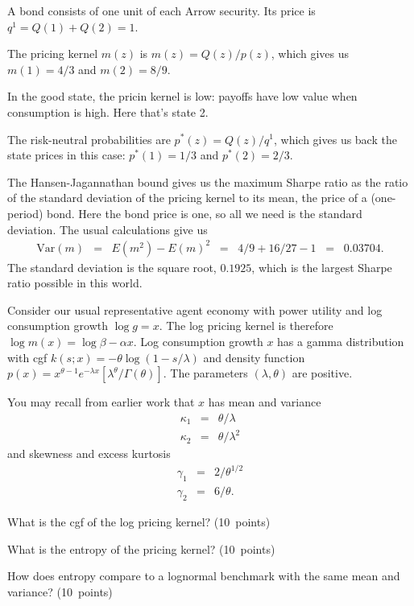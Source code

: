 \documentclass[11pt]{exam}
\begin{document}
\begin{questions}
\begin{solution}
\begin{parts}
\item A bond consists of one unit of each Arrow security.
Its price is $q^1 = Q(1) + Q(2) = 1$.
\item The pricing kernel $m(z)$ is $ m(z) = Q(z)/p(z)$,
which gives us $m(1) = 4/3$ and $m(2) = 8/9$.
\item In the good state, the pricin kernel is low: payoffs
have low value when consumption is high.
Here that's state 2.
\item The risk-neutral probabilities are
$ p^*(z) = Q(z)/q^1 $,
which gives us back the state prices in this case:
$p^*(1) = 1/3$ and $p^*(2) = 2/3 $.
\item The Hansen-Jagannathan bound gives us the maximum Sharpe ratio
as the ratio of the standard deviation of the pricing kernel to its mean,
the price of a (one-period) bond.
Here the bond price is one, so all we need is the standard deviation.
The usual calculations give us
\begin{eqnarray*}
    \mbox{Var}(m) &=& E(m^2) - E(m)^2
            \;\;=\;\; 4/9 + 16/27 - 1 \;\;=\;\; 0.03704.
\end{eqnarray*}
The standard deviation is the square root,  $0.1925$,
which is the largest Sharpe ratio possible in this world.

\end{parts}
\end{solution}

Consider our usual representative agent economy with power utility
and log consumption growth $ \log g = x$.
The log pricing kernel is therefore $\log m(x) = \log \beta -\alpha x $.
Log consumption growth $x$ has a gamma distribution with
cgf $ k(s; x) = - \theta \log (1-s/\lambda) $
and
density function $p(x) = x^{\theta-1} e^{-\lambda x} [\lambda^\theta/\Gamma(\theta)] $.
The parameters $(\lambda,\theta)$ are positive.

You may recall from earlier work that $x$ has mean and variance
\begin{eqnarray*}
    \kappa_1 &=& \theta /\lambda \\
    \kappa_2 &=& \theta /\lambda^2
\end{eqnarray*}
and skewness and excess kurtosis
\begin{eqnarray*}
    \gamma_1 &=& 2/\theta^{1/2} \\
    \gamma_2 &=& 6/\theta .
\end{eqnarray*}
%
\begin{parts}
\item What is the cgf of the log pricing kernel?
(10~points)
\item What is the entropy of the pricing kernel?
(10~points)
\item How does entropy compare to a lognormal benchmark
with the same mean and variance?
(10~points)
\end{parts}


\end{questions}
\end{document}

